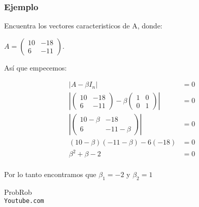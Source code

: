 \documentclass[12pt]{report}                                %
\begin{document}
            \clearpage
            \subsubsection{Ejemplo}
            Encuentra los vectores caracteristicos de A, donde:

            $A = \begin{pmatrix}10&-18\\6&-11\end{pmatrix}$.

            Así que empecemos:

            \begin{equation*}
            \begin{split}
                \left|A - \beta I_n \right| &= 0 \\
                \left|\begin{pmatrix}10&-18\\6&-11\end{pmatrix} - \beta \begin{pmatrix}1&0\\0&1\end{pmatrix}\right| &= 0 \\
                \left|\begin{pmatrix}10 -\beta&-18\\6&-11-\beta\end{pmatrix} \right| &= 0 \\
                (10-\beta)(-11 -\beta) -6(-18)  &= 0 \\
                \beta^2 + \beta -2 &= 0 \\
            \end{split}
            \end{equation*}

            Por lo tanto encontramos que $\beta_1 = -2 $ y $ \beta_2 = 1$


        
        


\clearpage

    \begin{thebibliography}{9}

        ProbRob
        \\\texttt{Youtube.com}


     

\end{thebibliography}
\end{document}
